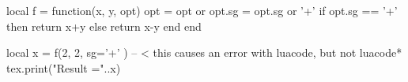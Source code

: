 \documentclass[]{standalone}%
\begin{document}
\begin{luacode}
local f = function(x, y, opt)
    opt = opt or {}
    opt.sg = opt.sg or '+'
    if opt.sg == '+' then return x+y
    else
        return x-y
    end
end

local x = 
  f(2,
    2,
    {sg='+'}
    ) -- < this causes an error with luacode, but not luacode*
tex.print("Result ="..x)
\end{luacode}
\end{document}

